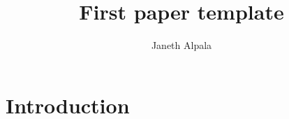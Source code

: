 \documentclass[letterpaper,10pt]{article}
\begin{document}
\title{First paper template }


\author{Janeth Alpala }

\address{  Universidade Federal de Pernambuco\\
}






\section{Introduction}




\end{document}
